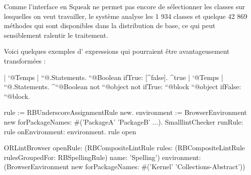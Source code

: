 \documentclass[a4paper,10pt,twoside]{book}
\begin{document}
Comme l'interface en Squeak ne permet pas encore de s\'electionner les
classes sur lesquelles on veut travailler, le syst\`eme analyse les 1
934 classes et quelque 42 869 m\'ethodes qui sont disponibles dans la
distribution de base, ce qui peut sensiblement ralentir le traitement.

Voici quelques exemples d'
expressions qui pourraient être avantageusement transform\'ees :

\begin{code}{}
| `@Temps | ``@.Statements. ``@Boolean ifTrue: [^false]. ^true
| `@Temps | ``@.Statements. ^``@Boolean not
``@object not ifTrue: ``@block
``@object ifFalse: ``@block.
\end{code}



\begin{code}{}
rule := RBUnderscoreAssignmentRule new.
environment := BrowserEnvironment new forPackageNames: \#('PackageA'
'PackageB' ...).
SmalllintChecker runRule: rule onEnvironment: environment.
rule open
\end{code}

\begin{code}{}
ORLintBrowser
	openRule: (RBCompositeLintRule rules: (RBCompositeLintRule
rulesGroupedFor: RBSpellingRule) name: 'Spelling')
	environment: (BrowserEnvironment new forPackageNames: \#('Kernel'
'Collections-Abstract'))
\end{code}
\end{document}
